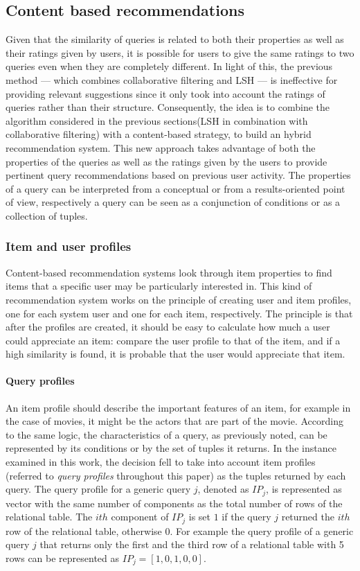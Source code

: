\subsection{Content based recommendations}  \label{hybrid_rec_sys_solution}
Given that the similarity of queries is related to both their properties as well as their ratings given by users, it is possible for users to give the same ratings to two queries even when they are completely different. In light of this, the previous method — which combines collaborative filtering and LSH — is ineffective for providing relevant suggestions since it only took into account the ratings of queries rather than their structure.
Consequently, the idea is to combine the algorithm considered in the previous sections(LSH in combination with collaborative filtering) with a content-based strategy, to build an hybrid recommendation system. This new approach takes advantage of both the properties of the queries as well as the ratings given by the users to provide pertinent query recommendations based on previous user activity. The properties of a query can be interpreted from a conceptual or from a results-oriented point of view, respectively a query can be seen as a conjunction of conditions or as a collection of tuples. 

\subsubsection{Item and user profiles} Content-based recommendation systems look through item properties to find items that a specific user may be particularly interested in. This kind of recommendation system works on the principle of creating user and item profiles, one for each system user and one for each item, respectively. The principle is that after the profiles are created, it should be easy to calculate how much a user could appreciate an item: compare the user profile to that of the item, and if a high similarity is found, it is probable that the user would appreciate that item. 

\paragraph{Query profiles} An item profile should describe the important features of an item, for example in the case of movies, it might be the actors that are part of the movie. According to the same logic, the characteristics of a query, as previously noted, can be represented by its conditions or by the set of tuples it returns. In the instance examined in this work, the decision fell to take into account item profiles (referred to \emph{query profiles} throughout this paper) as the tuples returned by each query. The query profile for a generic query $j$, denoted as $IP_j$, is represented as vector with the same number of components as the total number of rows of the relational table. The $ith$ component of $IP_j$ is set $1$ if the query $j$ returned the $ith$ row of the relational table, otherwise $0$. For example the query profile of a generic query $j$ that returns only the first and the third row of a relational table with 5 rows can be represented as $IP_j = [1,0,1,0,0]$. 

